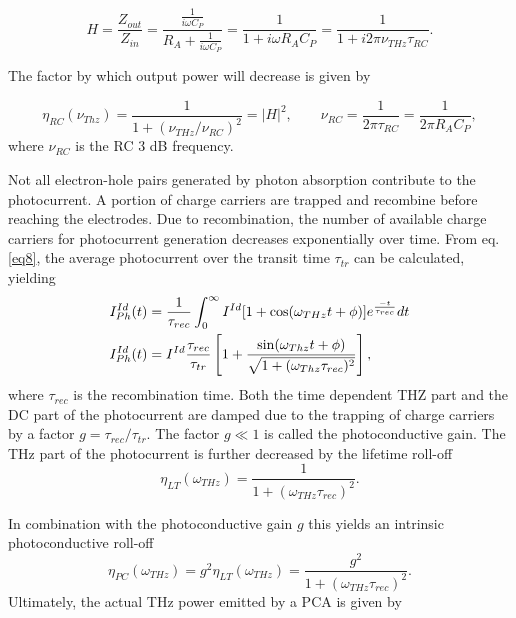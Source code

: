 \begin{equation}
    H = \frac{Z_{out}}{Z_{in}} = \frac{\frac{1}{i\omega C_P}}{R_A + \frac{1}{i\omega C_P}} = \frac{1}{1 + i\omega R_A C_P} = \frac{1}{1 + i 2\pi \nu_{THz} \tau_{RC}}.    
	\label{transferfunction}
\end{equation}

The factor by which output power will decrease is given by 

\begin{equation}
    \eta_{RC}(\nu_{Thz}) = \frac{1}{1+ (\nu_{THz}/\nu_{RC})^2} = |H|^2,  \qquad  \nu_{RC} = \frac{1}{2\pi\tau_{RC}} = \frac{1}{2\pi R_A C_P},
\end{equation}
where $\nu_{RC}$ is the RC 3 dB frequency.

Not all electron-hole pairs generated by photon absorption contribute to the photocurrent. A portion of charge carriers are trapped and recombine before reaching the electrodes. Due to recombination, the number of available charge carriers for photocurrent generation decreases exponentially over time. From eq. \eqref{eq8}, the average photocurrent over the transit time $\tau_{tr}$ can be calculated, yielding
\begin{align}
	I_{Ph}^{Id}(t) &= \frac{1}{\tau_{rec}} \int_{0}^{\infty} I^{Id}[1 + \cos(\omega_{THz}t + \phi)]e^{\frac{-t}{\tau_{rec}}}dt \notag \\
	I_{Ph}^{Id}(t) &=  I^{Id}\frac{\tau_{rec}}{\tau_{tr}}\left[
		1 + \frac{\sin(\omega_{Thz}t + \phi)}{\sqrt{1 + (\omega_{Thz} \tau_{rec})^2}}
	\right],
\end{align}
where $\tau_{rec}$ is the recombination time. Both the time dependent THZ part and the DC part of the photocurrent are damped due to the trapping of charge carriers by a factor $g = \tau_{rec} /\tau_{tr}$. The factor $g \ll 1$ is called the photoconductive gain. The THz part of the photocurrent is further decreased by the lifetime roll-off 
\begin{equation}
	\eta_{LT}(\omega_{THz}) = \frac{1}{1 + (\omega_{THz}\tau_{rec})^2}.
\end{equation}

In combination with the photoconductive gain $g$ this yields an intrinsic photoconductive roll-off
\begin{equation}
	\eta_{PC}(\omega_{THz}) = g^2\eta_{LT}(\omega_{THz}) = \frac{g^2}{1 + (\omega_{THz}\tau_{rec})^2}.
\end{equation}
Ultimately, the actual THz power emitted by a PCA is given by 

